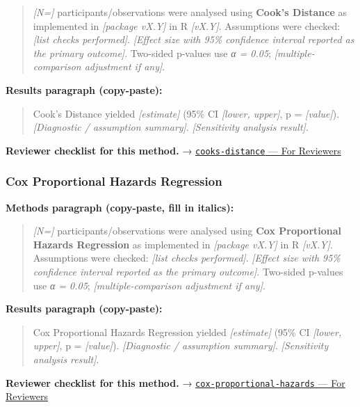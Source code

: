 \documentclass[
]{article}
\begin{document}
\begin{quote}
\emph{{[}N={]}} participants/observations were analysed using
\textbf{Cook's Distance} as implemented in \emph{{[}package vX.Y{]}} in
R \emph{{[}vX.Y{]}}. Assumptions were checked: \emph{{[}list checks
performed{]}}. \emph{{[}Effect size with 95\% confidence interval
reported as the primary outcome{]}}. Two-sided p-values use \emph{α =
0.05}; \emph{{[}multiple-comparison adjustment if any{]}}.
\end{quote}

\textbf{Results paragraph (copy-paste):}

\begin{quote}
Cook's Distance yielded \emph{{[}estimate{]}} (95\% CI \emph{{[}lower,
upper{]}}, p = \emph{{[}value{]}}). \emph{{[}Diagnostic / assumption
summary{]}}. \emph{{[}Sensitivity analysis result{]}}.
\end{quote}

\textbf{Reviewer checklist for this method.} →
\href{../chapters/07-regression/cooks-distance.Rmd\#for-reviewers}{\texttt{cooks-distance}
--- For Reviewers}

\subsubsection{Cox Proportional Hazards
Regression}\label{cox-proportional-hazards-regression}

\textbf{Methods paragraph (copy-paste, fill in italics):}

\begin{quote}
\emph{{[}N={]}} participants/observations were analysed using
\textbf{Cox Proportional Hazards Regression} as implemented in
\emph{{[}package vX.Y{]}} in R \emph{{[}vX.Y{]}}. Assumptions were
checked: \emph{{[}list checks performed{]}}. \emph{{[}Effect size with
95\% confidence interval reported as the primary outcome{]}}. Two-sided
p-values use \emph{α = 0.05}; \emph{{[}multiple-comparison adjustment if
any{]}}.
\end{quote}

\textbf{Results paragraph (copy-paste):}

\begin{quote}
Cox Proportional Hazards Regression yielded \emph{{[}estimate{]}} (95\%
CI \emph{{[}lower, upper{]}}, p = \emph{{[}value{]}}).
\emph{{[}Diagnostic / assumption summary{]}}. \emph{{[}Sensitivity
analysis result{]}}.
\end{quote}

\textbf{Reviewer checklist for this method.} →
\href{../chapters/11-survival/cox-proportional-hazards.Rmd\#for-reviewers}{\texttt{cox-proportional-hazards}
--- For Reviewers}
\end{document}
